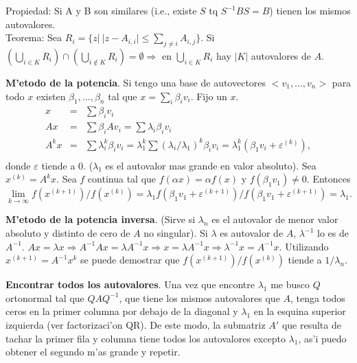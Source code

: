 \documentclass[a4paper,spanish]{article}
\newcommand{\limite}[2]{\lim_{ #1 \rightarrow #2}}
\newcommand{\eps}[0]{\varepsilon}
\newcommand{\lthen}[0]{\Rightarrow}
\begin{document}
Propiedad: Si A y B son similares (i.e., existe $S$ tq $S^{-1}BS = B$) tienen
los mismos autovalores. \\
Teorema: Sea $R_i = \{z |\ |z-A_{i,i}| \leq \sum_{j \neq i} A_{i,j}\}$. Si
$\left(\bigcup_{i \in K} R_i\right) \cap \left(\bigcup_{i \notin K} R_i\right)
	= \emptyset \lthen$
en $\bigcup_{i \in K} R_i$ hay $|K|$ autovalores de $A$.

\textbf{M'etodo de la potencia}. Si tengo una base de autovectores 
$<v_1,...,v_n>$ para todo $x$ existen $\beta_1,...,\beta_n$ tal que
$x = \sum_i \beta_i v_i$. Fijo un $x$. \\
\begin{eqnarray*}
x &=& \sum \beta_i v_i \\
Ax &=& \sum \beta_i A v_i = \sum \lambda_i \beta_i v_i \\
A^kx &=& \sum \lambda_i^k \beta_i v_i = 
	\lambda_1^k \sum (\lambda_i/\lambda_1)^k \beta_i v_i = 
		\lambda_1^k (\beta_1 v_i + \eps^{(k)}), \\
\end{eqnarray*}
donde $\eps$ tiende a $0$. ($\lambda_1$ es el autovalor mas grande en valor
absoluto). Sea $x^{(k)} = A^k x$. Sea $f$ continua tal que 
$f(\alpha x) = \alpha f(x)$ y $f(\beta_1 v_1) \neq 0$. Entonces
$$\limite{k}{\infty} f(x^{(k+1)}) / f(x^{(k)}) = \lambda_1 
  f(\beta_1 v_1 + \eps^{(k+1)}) / f(\beta_1 v_1 + \eps^{(k+1)}) = \lambda_1.$$
  
\textbf{M'etodo de la potencia inversa}. (Sirve si $\lambda_n$ es el autovalor
de menor valor absoluto y distinto de cero de $A$ no singular). 
Si $\lambda$ es autovalor de $A$, 
$\lambda^{-1}$ lo es de $A^{-1}$. $Ax = \lambda x \lthen  A^{-1} Ax = 
\lambda A^{-1} x \lthen x = \lambda A^{-1} x \lthen \lambda^{-1} x = A^{-1} x$.
Utilizando $x^{(k+1)} = A^{-1} x^k$ se puede demostrar que 
$f(x^{(k+1)}) / f(x^{(k)})$ tiende a $1/\lambda_n$.

\textbf{Encontrar todos los autovalores}. Una vez que encontre $\lambda_1$ me
busco $Q$ ortonormal tal que $QAQ^{-1}$, que tiene los mismos autovalores que
$A$, tenga todos ceros en la primer columna por debajo de la diagonal y 
$\lambda_1$ en la esquina superior izquierda (ver factorizaci'on QR). De este
modo, la submatriz $A'$ que resulta de tachar la primer fila y columna tiene
todos los autovalores excepto $\lambda_1$, as'i puedo obtener el segundo
m'as grande y repetir.

\label{theend}
\end{document}

